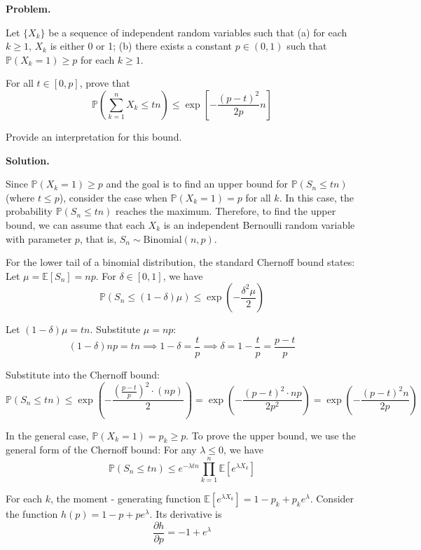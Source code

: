 \documentclass[12pt, a4paper, oneside]{ctexart}
\newcounter{problemname}
\newenvironment{problem}{\begin{shaded}\stepcounter{problemname}\par\noindent\textbf{Problem\arabic{problemname}. }}{\end{shaded}\par}
\newenvironment{solution}{\par\noindent\textbf{Solution. }}{\par}
\begin{document}
\begin{problem}

\noindent Let $ \{X_k\} $ be a sequence of independent random variables such that
(a) for each $ k \geq 1 $, $ X_k $ is either 0 or 1;
(b) there exists a constant $ p \in (0, 1) $ such that $ \mathbb{P}(X_k = 1) \geq p $ for each $ k \geq 1 $.

\noindent For all $ t \in [0, p] $, prove that
$$ \mathbb{P}\left( \sum_{k = 1}^n X_k \leq tn \right) \leq \exp\left[ -\frac{(p - t)^2}{2p}n \right] $$

\noindent Provide an interpretation for this bound.

\end{problem}

\begin{solution}

Since $ \mathbb{P}(X_k = 1)\geq p $ and the goal is to find an upper bound for $ \mathbb{P}(S_n\leq tn) $ (where $ t\leq p $), consider the case when $ \mathbb{P}(X_k = 1)=p $ for all $ k $. In this case, the probability $ \mathbb{P}(S_n\leq tn) $ reaches the maximum. Therefore, to find the upper bound, we can assume that each $ X_k $ is an independent Bernoulli random variable with parameter $ p $, that is, $ S_n\sim \text{Binomial}(n,p) $.

For the lower tail of a binomial distribution, the standard Chernoff bound states: Let $ \mu=\mathbb{E}[S_n]=np $. For $ \delta\in[0,1] $, we have
$$
\mathbb{P}(S_n\leq(1 - \delta)\mu)\leq\exp\left(-\frac{\delta^2\mu}{2}\right)
$$

Let $ (1 - \delta)\mu = tn $. Substitute $ \mu = np $:
$$
(1 - \delta)np=tn\implies 1 - \delta=\frac{t}{p}\implies\delta = 1-\frac{t}{p}=\frac{p - t}{p}
$$

Substitute into the Chernoff bound:
$$
\mathbb{P}(S_n\leq tn)\leq\exp\left(-\frac{\left(\frac{p - t}{p}\right)^2\cdot(np)}{2}\right)=\exp\left(-\frac{(p - t)^2\cdot np}{2p^2}\right)=\exp\left(-\frac{(p - t)^2n}{2p}\right)
$$

In the general case, $ \mathbb{P}(X_k = 1)=p_k\geq p $. To prove the upper bound, we use the general form of the Chernoff bound: For any $ \lambda\leq0 $, we have
$$
\mathbb{P}(S_n\leq tn)\leq e^{-\lambda tn}\prod_{k = 1}^n\mathbb{E}[e^{\lambda X_k}]
$$

For each $ k $, the moment - generating function $ \mathbb{E}[e^{\lambda X_k}]=1 - p_k + p_ke^{\lambda} $. Consider the function $ h(p)=1 - p+pe^{\lambda} $. Its derivative is
$$
\frac{\partial h}{\partial p}=- 1+e^{\lambda}
$$


\end{solution}
\end{document}

